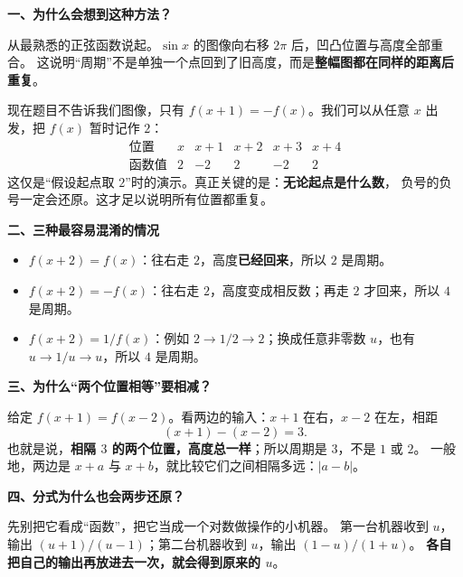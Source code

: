 \clearpage
\begin{explanationbox}
\textbf{一、为什么会想到这种方法？}



从最熟悉的正弦函数说起。$\sin x$ 的图像向右移 $2\pi$ 后，凹凸位置与高度全部重合。
这说明“周期”不是单独一个点回到了旧高度，而是\textbf{整幅图都在同样的距离后重复}。

现在题目不告诉我们图像，只有 $f(x+1)=-f(x)$。我们可以从任意 $x$ 出发，把 $f(x)$ 暂时记作 $2$：
\[
\begin{array}{c|ccccc}
 \text{位置}&x&x+1&x+2&x+3&x+4\\\hline
 \text{函数值}&2&-2&2&-2&2
\end{array}
\]
这仅是“假设起点取 $2$”时的演示。真正关键的是：\textbf{无论起点是什么数}，
负号的负号一定会还原。这才足以说明所有位置都重复。


\end{explanationbox}\clearpage\begin{explanationbox}\textbf{二、三种最容易混淆的情况}


\begin{itemize}[leftmargin=*,itemsep=0.45em]
\item $f(x+2)=f(x)$：往右走 $2$，高度\textbf{已经回来}，所以 $2$ 是周期。
\item $f(x+2)=-f(x)$：往右走 $2$，高度变成相反数；再走 $2$ 才回来，所以 $4$ 是周期。
\item $f(x+2)=1/f(x)$：例如 $2\to1/2\to2$；换成任意非零数 $u$，也有
$u\to1/u\to u$，所以 $4$ 是周期。
\end{itemize}

\end{explanationbox}\clearpage\begin{explanationbox}\textbf{三、为什么“两个位置相等”要相减？}



给定 $f(x+1)=f(x-2)$。看两边的输入：$x+1$ 在右，$x-2$ 在左，相距
\[(x+1)-(x-2)=3.\]
也就是说，\textbf{相隔 $3$ 的两个位置，高度总一样}；所以周期是 $3$，不是 $1$ 或 $2$。
一般地，两边是 $x+a$ 与 $x+b$，就比较它们之间相隔多远：$|a-b|$。

\end{explanationbox}\clearpage\begin{explanationbox}\textbf{四、分式为什么也会两步还原？}





先别把它看成“函数”，把它当成一个对数做操作的小机器。
第一台机器收到 $u$，输出 $(u+1)/(u-1)$；第二台机器收到 $u$，输出 $(1-u)/(1+u)$。
\textbf{各自把自己的输出再放进去一次，就会得到原来的 $u$}。


\end{explanationbox}
